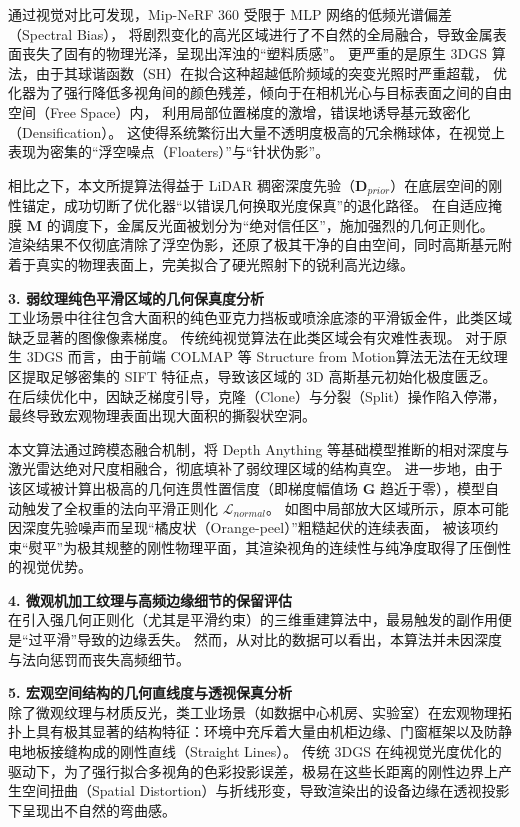 通过视觉对比可发现，Mip-NeRF 360 受限于 MLP 网络的低频光谱偏差（Spectral Bias），
将剧烈变化的高光区域进行了不自然的全局融合，导致金属表面丧失了固有的物理光泽，呈现出浑浊的“塑料质感”。
更严重的是原生 3DGS 算法，由于其球谐函数（SH）在拟合这种超越低阶频域的突变光照时严重超载，
优化器为了强行降低多视角间的颜色残差，倾向于在相机光心与目标表面之间的自由空间（Free Space）内，
利用局部位置梯度的激增，错误地诱导基元致密化（Densification）。
这使得系统繁衍出大量不透明度极高的冗余椭球体，在视觉上表现为密集的“浮空噪点（Floaters）”与“针状伪影”。

相比之下，本文所提算法得益于 LiDAR 稠密深度先验（$\bm{D}_{prior}$）在底层空间的刚性锚定，成功切断了优化器“以错误几何换取光度保真”的退化路径。
在自适应掩膜 $\bm{M}$ 的调度下，金属反光面被划分为“绝对信任区”，施加强烈的几何正则化。
渲染结果不仅彻底清除了浮空伪影，还原了极其干净的自由空间，同时高斯基元附着于真实的物理表面上，完美拟合了硬光照射下的锐利高光边缘。

\textbf{3. 弱纹理纯色平滑区域的几何保真度分析} \\
工业场景中往往包含大面积的纯色亚克力挡板或喷涂底漆的平滑钣金件，此类区域缺乏显著的图像像素梯度。
传统纯视觉算法在此类区域会有灾难性表现。
对于原生 3DGS 而言，由于前端 COLMAP 等 Structure from Motion算法无法在无纹理区提取足够密集的 SIFT 特征点，导致该区域的 3D 高斯基元初始化极度匮乏。
在后续优化中，因缺乏梯度引导，克隆（Clone）与分裂（Split）操作陷入停滞，最终导致宏观物理表面出现大面积的撕裂状空洞。

本文算法通过跨模态融合机制，将 Depth Anything 等基础模型推断的相对深度与激光雷达绝对尺度相融合，彻底填补了弱纹理区域的结构真空。
进一步地，由于该区域被计算出极高的几何连贯性置信度（即梯度幅值场 $\bm{G}$ 趋近于零），模型自动触发了全权重的法向平滑正则化 $\mathcal{L}_{normal}$。
如图中局部放大区域所示，原本可能因深度先验噪声而呈现“橘皮状（Orange-peel）”粗糙起伏的连续表面，
被该项约束“熨平”为极其规整的刚性物理平面，其渲染视角的连续性与纯净度取得了压倒性的视觉优势。

\textbf{4. 微观机加工纹理与高频边缘细节的保留评估} \\
在引入强几何正则化（尤其是平滑约束）的三维重建算法中，最易触发的副作用便是“过平滑”导致的边缘丢失。
然而，从对比的数据可以看出，本算法并未因深度与法向惩罚而丧失高频细节。

\textbf{5. 宏观空间结构的几何直线度与透视保真分析} \\
除了微观纹理与材质反光，类工业场景（如数据中心机房、实验室）在宏观物理拓扑上具有极其显著的结构特征：环境中充斥着大量由机柜边缘、门窗框架以及防静电地板接缝构成的刚性直线（Straight Lines）。
传统 3DGS 在纯视觉光度优化的驱动下，为了强行拟合多视角的色彩投影误差，极易在这些长距离的刚性边界上产生空间扭曲（Spatial Distortion）与折线形变，导致渲染出的设备边缘在透视投影下呈现出不自然的弯曲感。

